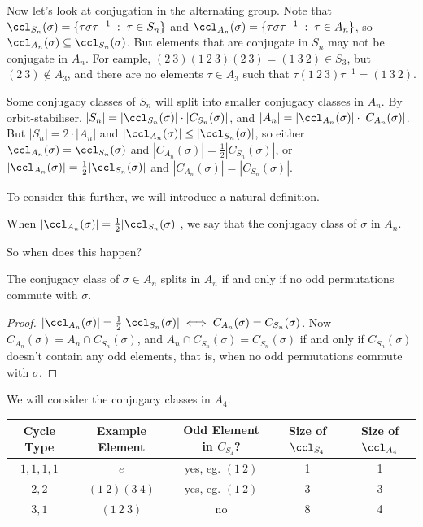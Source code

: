 \documentclass[a4]{scrreprt}
\begin{document}
Now let's look at conjugation in the alternating group. Note that $\ccl_{S_n}(\sigma) = \{\tau \sigma \tau^{-1} \; : \; \tau \in S_n\}$ and $\ccl_{A_n}(\sigma) = \{\tau \sigma \tau^{-1} \; : \; \tau \in A_n\}$, so $\ccl_{A_n}(\sigma) \subseteq \ccl_{S_n}(\sigma)$. But elements that are conjugate in $S_n$ may not be conjugate in $A_n$. For eample, $(2\ 3)(1\ 2\ 3)(2\ 3) = (1\ 3\ 2) \in S_3$, but $(2\ 3) \not\in A_3$, and there are no elements $\tau \in A_3$ such that $\tau (1\ 2\ 3)\tau^{-1} = (1\ 3\ 2)$. 

Some conjugacy classes of $S_n$ will split into smaller conjugacy classes in $A_n$. By orbit-stabiliser, $|S_n| = |\ccl_{S_n}(\sigma)| \cdot |C_{S_n}(\sigma)|$, and $|A_n| = |\ccl_{A_n}(\sigma)| \cdot |C_{A_n}(\sigma)|$. But $|S_n| = 2 \cdot |A_n|$ and $|\ccl_{A_n}(\sigma)| \leq |\ccl_{S_n}(\sigma)|$, so either $\ccl_{A_n}(\sigma) = \ccl_{S_n}(\sigma)$ and $|C_{A_n}(\sigma)| = \frac{1}{2}|C_{S_n}(\sigma)|$, or $|\ccl_{A_n}(\sigma)| = \frac{1}{2}|\ccl_{S_n}(\sigma)|$ and $|C_{A_n}(\sigma)| = |C_{S_n}(\sigma)|$.

To consider this further, we will introduce a natural definition.

\begin{definition}
When $|\ccl_{A_n}(\sigma)| = \frac{1}{2}|\ccl_{S_n}(\sigma)|$, we say that the conjugacy class of $\sigma$  in $A_n$.
\end{definition}

So when does this happen?

\begin{proposition}
	The conjugacy class of $\sigma \in A_n$ splits in $A_n$ if and only if no odd permutations commute with $\sigma$.
\end{proposition}
\begin{proof}
	$|\ccl_{A_n}(\sigma)| = \frac{1}{2}|\ccl_{S_n}(\sigma)| \iff C_{A_n}(\sigma) = C_{S_n}(\sigma)$. Now $C_{A_n}(\sigma) = A_n \cap C_{S_n}(\sigma)$, and $A_n \cap C_{S_n}(\sigma) = C_{S_n}(\sigma)$ if and only if $C_{S_n}(\sigma)$ doesn't contain any odd elements, that is, when no odd permutations commute with $\sigma$.
\end{proof}

\begin{example}
	We will consider the conjugacy classes in $A_4$. 
	\begin{center}
		\begin{tabular}{@{}ccccc@{}}
		\toprule
		Cycle Type & Example Element &Odd Element in $C_{S_4}$? & Size of $\ccl_{S_4}$ & Size of $\ccl_{A_4}$ \\ \midrule
		$1, 1, 1, 1$ & $e$ & yes, eg. $(1\ 2)$ & 1 & 1 \\
		$2, 2$ & $(1\ 2)(3\ 4)$ & yes, eg. $(1\ 2)$ & 3 & 3\\
		$3, 1$ & $(1\ 2\ 3)$ & no & 8 & 4\\
		\bottomrule
		\end{tabular}
	\end{center}
\end{example}
\end{document}
